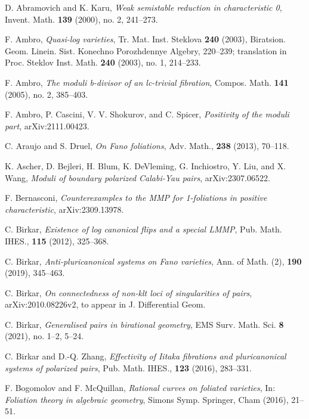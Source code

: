 \documentclass[11pt]{amsart}
\numberwithin{equation}{section}
\theoremstyle{definition}
\theoremstyle{definition}
\theoremstyle{definition}
\begin{document}
\begin{thebibliography}{99}



 D. Abramovich and K. Karu, \textit{Weak semistable reduction in characteristic 0}, Invent. Math. \textbf{139} (2000), no. 2, 241--273.

 F. Ambro, \textit{Quasi-log varieties}, Tr. Mat. Inst. Steklova \textbf{240} (2003), Biratsion. Geom. Linein. Sist. Konechno Porozhdennye Algebry, 220--239; translation in Proc. Steklov Inst. Math. \textbf{240} (2003), no. 1, 214--233.

 F. Ambro, \textit{The moduli b-divisor of an lc-trivial fibration}, Compos. Math. \textbf{141} (2005), no. 2, 385--403.

 F. Ambro, P. Cascini, V. V. Shokurov, and C. Spicer, \textit{Positivity of the moduli part}, arXiv:2111.00423.

 C. Araujo and S. Druel, \textit{On Fano foliations}, Adv. Math., \textbf{238} (2013), 70--118.

 K. Ascher, D. Bejleri, H. Blum, K. DeVleming, G. Inchiostro, Y. Liu, and X. Wang, \textit{Moduli of boundary polarized Calabi-Yau pairs}, arXiv:2307.06522.

 F. Bernasconi, \textit{Counterexamples to the MMP for 1-foliations in positive characteristic}, arXiv:2309.13978.

 C. Birkar, \textit{Existence of log canonical flips and a special LMMP}, Pub. Math. IHES., \textbf{115} (2012), 325--368.

 C. Birkar, \textit{Anti-pluricanonical systems on Fano varieties}, Ann. of Math. (2), \textbf{190} (2019), 345--463.


 C. Birkar, \textit{On connectedness of non-klt loci of singularities of pairs}, arXiv:2010.08226v2, to appear in J. Differential Geom.

 C. Birkar, \textit{Generalised pairs in birational geometry}, EMS Surv. Math. Sci. \textbf{8} (2021), no. 1--2, 5--24.

 C. Birkar and D.-Q. Zhang, \textit{Effectivity of Iitaka fibrations and pluricanonical systems of polarized pairs}, Pub. Math. IHES., \textbf{123} (2016), 283--331.

 F. Bogomolov and F. McQuillan, \textit{Rational curves on foliated varieties}, In: \textit{Foliation theory in algebraic
geometry}, Simons Symp. Springer, Cham (2016), 21--51.


\end{thebibliography}
\end{document}

